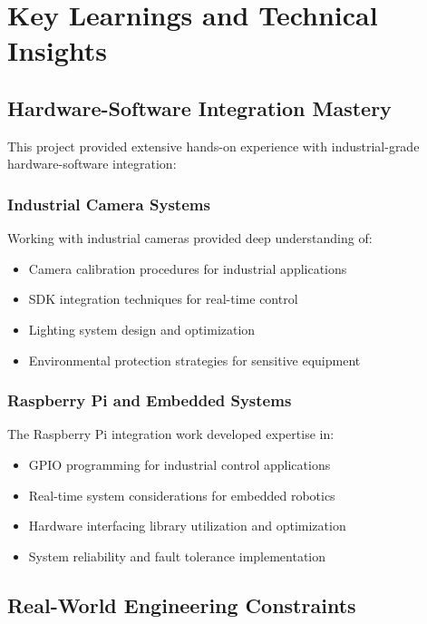 \documentclass{book}
\begin{document}
\chapter{Key Learnings and Technical Insights}

\section{Hardware-Software Integration Mastery}

\par\noindent This project provided extensive hands-on experience with industrial-grade hardware-software integration:

\subsection{Industrial Camera Systems}
\par\noindent Working with industrial cameras provided deep understanding of:

\begin{itemize}
\item Camera calibration procedures for industrial applications
\item SDK integration techniques for real-time control
\item Lighting system design and optimization
\item Environmental protection strategies for sensitive equipment
\end{itemize}

\subsection{Raspberry Pi and Embedded Systems}
\par\noindent The Raspberry Pi integration work developed expertise in:

\begin{itemize}
\item GPIO programming for industrial control applications
\item Real-time system considerations for embedded robotics
\item Hardware interfacing library utilization and optimization
\item System reliability and fault tolerance implementation
\end{itemize}

\section{Real-World Engineering Constraints}
\end{document}

